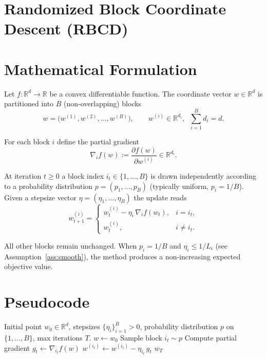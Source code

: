 \documentclass{article}
\newcommand{\R}{\mathbb{R}}
\begin{document}
\section*{Randomized Block Coordinate Descent (RBCD)}

\section*{Mathematical Formulation}
Let $f:\R^{d}\rightarrow\R$ be a convex differentiable function.  
The coordinate vector $w\in\R^{d}$ is partitioned into $B$ (non‑overlapping) blocks
\[
w=\bigl(w^{(1)},w^{(2)},\dots ,w^{(B)}\bigr),\qquad 
w^{(i)}\in\R^{d_i},\;\;\sum_{i=1}^{B}d_i=d .
\]

For each block $i$ define the partial gradient
\[
\nabla_i f(w):=\frac{\partial f(w)}{\partial w^{(i)}}\in\R^{d_i}.
\]

At iteration $t\ge 0$ a block index $i_t\in\{1,\dots ,B\}$ is drawn independently
according to a probability distribution $p=(p_1,\dots ,p_B)$
(typically uniform, $p_i=1/B$).  
Given a stepsize vector $\eta=(\eta_1,\dots ,\eta_B)$ the update reads
\[
\boxed{
w_{t+1}^{(i)}=
\begin{cases}
w_{t}^{(i)}-\eta_i\,\nabla_i f(w_t), & i=i_t,\\[4pt]
w_{t}^{(i)}, & i\neq i_t .
\end{cases}}
\tag{RBCD}
\]

All other blocks remain unchanged.  
When $p_i=1/B$ and $\eta_i\le 1/L_i$ (see Assumption~\ref{ass:smooth}), the method
produces a non‑increasing expected objective value.

\section*{Pseudocode}
\begin{algorithm}[H]
\caption{Randomized Block Coordinate Descent}
\begin{algorithmic}[1]
\Require Initial point $w_0\in\R^{d}$, stepsizes $\{\eta_i\}_{i=1}^B>0$, 
probability distribution $p$ on $\{1,\dots ,B\}$, max iterations $T$.
\State $w \gets w_0$
    \State Sample block $i_t\sim p$                                   
    \State Compute partial gradient $g_t \gets \nabla_{i_t} f(w)$
    \State $w^{(i_t)} \gets w^{(i_t)} - \eta_{i_t}\, g_t$                
\EndFor
\State \Return $w_T$
\end{algorithmic}
\end{algorithm}
\end{document}
